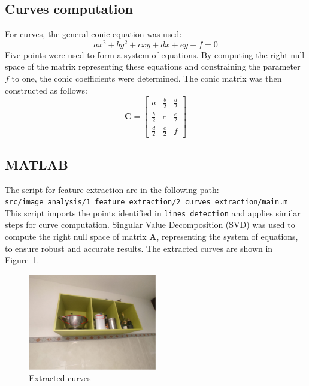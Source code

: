 \documentclass{Academic}
\begin{document}
\subsection{Curves computation}
For curves, the general conic equation was used:
\begin{equation}ax^2 + by^2 + cxy + dx + ey + f = 0\end{equation}
Five points were used to form a system of equations. 
By computing the right null space of the matrix representing these equations and constraining the parameter $f$ to one, the conic coefficients were determined. 
The conic matrix was then constructed as follows:
\begin{equation}\mathbf{C} = \begin{bmatrix} a & \frac{b}{2} & \frac{d}{2} \\ \frac{b}{2} & c & \frac{e}{2} \\ \frac{d}{2} & \frac{e}{2} & f\end{bmatrix}\end{equation}

\subsection*{MATLAB}
The script for feature extraction are in the following path: \\ 
\texttt{src/image\_analysis/1\_feature\_extraction/2\_curves\_extraction/main.m} \\
This script imports the points identified in \texttt{lines\_detection} and applies similar steps for curve computation.
Singular Value Decomposition (SVD) was used to compute the right null space of matrix $\mathbf{A}$, representing the system of equations, to ensure robust and accurate results.
The extracted curves are shown in Figure~\ref{fig:ext_curves}.
\begin{figure}[!htb]%
    \centering
    \includegraphics[width=0.5\textwidth]{images/ext_curves.png}
    \caption{Extracted curves}
    \label{fig:ext_curves}
\end{figure}
\end{document}
